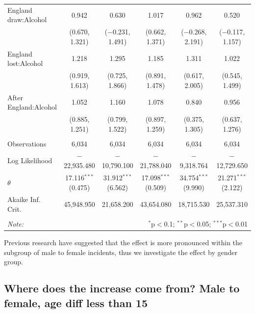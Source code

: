 \documentclass[12pt, letterpaper]{article}
\begin{document}
\begin{table}[htb]
{\begin{tabular}{@{\extracolsep{5pt}}lccccc}
  England draw:Alcohol & 0.942 & 0.630 & 1.017 & 0.962 & 0.520 \\ 
  & (0.670, 1.321) & ($-$0.231, 1.491) & (0.662, 1.371) & ($-$0.268, 2.191) & ($-$0.117, 1.157) \\ 
  England lost:Alcohol & 1.218 & 1.295 & 1.185 & 1.311 & 1.022 \\ 
  & (0.919, 1.613) & (0.725, 1.866) & (0.891, 1.478) & (0.617, 2.005) & (0.545, 1.499) \\ 
  After England:Alcohol & 1.052 & 1.160 & 1.078 & 0.840 & 0.956 \\ 
  & (0.885, 1.251) & (0.799, 1.522) & (0.897, 1.259) & (0.375, 1.305) & (0.637, 1.276) \\ 
 \hline \\[-1.8ex] 
Observations & 6,034 & 6,034 & 6,034 & 6,034 & 6,034 \\ 
Log Likelihood & $-$22,935.480 & $-$10,790.100 & $-$21,788.040 & $-$9,318.764 & $-$12,729.650 \\ 
$\theta$ & 17.116$^{***}$  (0.475) & 31.912$^{***}$  (6.562) & 17.098$^{***}$  (0.509) & 34.754$^{***}$  (9.990) & 21.271$^{***}$  (2.122) \\ 
Akaike Inf. Crit. & 45,948.950 & 21,658.200 & 43,654.080 & 18,715.530 & 25,537.310 \\ 
\hline 
\hline \\[-1.8ex] 
\textit{Note:}  & \multicolumn{5}{r}{$^{*}$p$<$0.1; $^{**}$p$<$0.05; $^{***}$p$<$0.01} \\ 
\end{tabular} 

} 

\end{table}


Previous research have suggested that the effect is more pronounced within the subgroup of male to female incidents, thus we investigate the effect by gender group. 




\newpage

\subsection{Where does the increase come from? Male to female, age diff less than 15}
\end{document}
